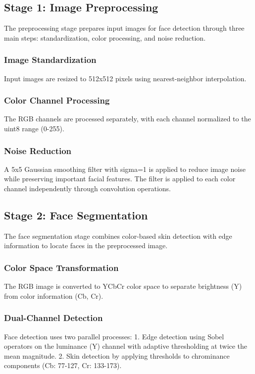 \documentclass[12pt,a4paper]{article}
\begin{document}
\subsection{Stage 1: Image Preprocessing}
The preprocessing stage prepares input images for face detection through three main steps: standardization, color processing, and noise reduction.

\subsubsection{Image Standardization}
Input images are resized to 512x512 pixels using nearest-neighbor interpolation.

\subsubsection{Color Channel Processing}
The RGB channels are processed separately, with each channel normalized to the uint8 range (0-255).

\subsubsection{Noise Reduction}
A 5x5 Gaussian smoothing filter with sigma=1 is applied to reduce image noise while preserving important facial features. The filter is applied to each color channel independently through convolution operations.

\subsection{Stage 2: Face Segmentation}
The face segmentation stage combines color-based skin detection with edge information to locate faces in the preprocessed image.

\subsubsection{Color Space Transformation}
The RGB image is converted to YCbCr color space to separate brightness (Y) from color information (Cb, Cr).

\subsubsection{Dual-Channel Detection}
Face detection uses two parallel processes:
1. Edge detection using Sobel operators on the luminance (Y) channel with adaptive thresholding at twice the mean magnitude.
2. Skin detection by applying thresholds to chrominance components (Cb: 77-127, Cr: 133-173).
\end{document}
